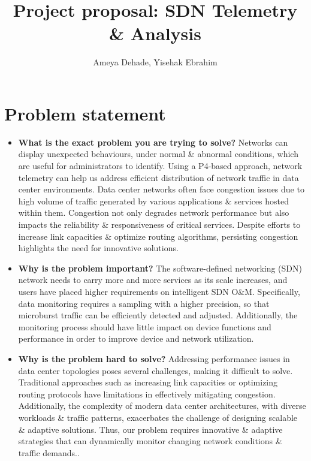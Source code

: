 \documentclass{hotnets23}
\begin{document}



\title{Project proposal: SDN Telemetry \& Analysis}

\author{Ameya Dehade, Yisehak Ebrahim}

\maketitle

\section*{Problem statement}

\begin{itemize}
\item {\textbf{What is the exact problem you are trying to solve?} 
Networks can display unexpected behaviours, under normal \& abnormal conditions, which are useful for administrators to identify. Using a P4-based approach, network telemetry can help us address efficient distribution of network traffic in data center environments. Data center networks often face congestion issues due to high volume of traffic generated by various applications \& services hosted within them. Congestion not only degrades network performance but also impacts the reliability \& responsiveness of critical services. Despite efforts to increase link capacities \& optimize routing algorithms, persisting congestion highlights the need for innovative solutions. \cite{WhatisTelemetry}}

\item {\textbf{Why is the problem important?} The software-defined networking (SDN) network needs to carry more and more services as its scale increases, and users have placed higher requirements on intelligent SDN O\&M. Specifically, data monitoring requires a sampling with a higher precision, so that microburst traffic can be efficiently detected and adjusted. Additionally, the monitoring process should have little impact on device functions and performance in order to improve device and network utilization.\cite{WhatisTelemetry}}

\item {\textbf{Why is the problem hard to solve?} Addressing performance issues in data center topologies poses several challenges, making it difficult to solve. Traditional approaches such as increasing link capacities or optimizing routing protocols have limitations in effectively mitigating congestion. Additionally, the complexity of modern data center architectures, with diverse workloads \& traffic patterns, exacerbates the challenge of designing scalable \& adaptive solutions. Thus, our problem requires innovative \& adaptive strategies that can dynamically monitor changing network conditions \& traffic demands..}

\end{itemize}
\end{document}
